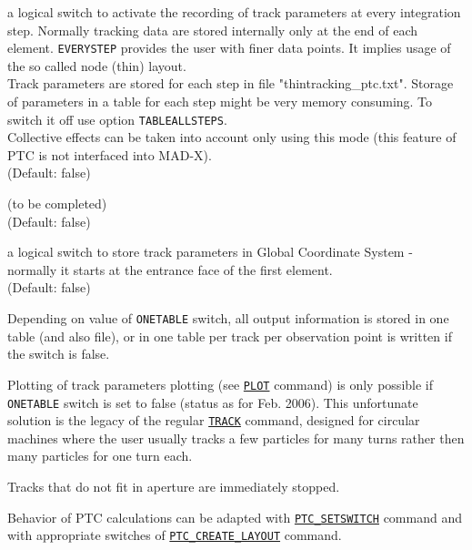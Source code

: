 \begin{madlist}
    a logical switch to activate the recording of
   track parameters at every integration step. Normally tracking data
   are stored internally only at the end of each element. {\tt EVERYSTEP}
   provides the user with finer data points. It implies usage of the so
   called node (thin) layout. \\ 
   Track parameters are stored for each step in file
   "thintracking\_ptc.txt". Storage of parameters in a table for each
   step might be very memory consuming. To switch it off use option
   {\tt TABLEALLSTEPS}.\\  
   Collective effects can be taken into account only using this mode
   (this feature of PTC is not interfaced into MAD-X). \\
   (Default: false)

    (to be completed) \\ (Default: false)
   
    a logical switch to store track parameters in Global
   Coordinate System - normally it starts at the entrance face of the
   first element. \\ (Default: false)
\end{madlist}


 Depending on value of {\tt ONETABLE} switch, all output information
is stored in one table (and also file), or in one table per track per
observation point is written if the switch is false. 


Plotting of track parameters plotting (see \hyperref[sec:plot]{\tt PLOT}
command) is only possible if {\tt ONETABLE} switch is set to false (status 
as for Feb. 2006). This unfortunate solution is the legacy of the
regular \madx \hyperref[chap:thintrack]{\tt TRACK} command, 
designed for circular machines where the user usually tracks a few
particles for many turns rather then many particles for one turn each.

Tracks that do not fit in aperture are immediately stopped. 

Behavior of PTC calculations can be adapted with
\hyperref[sec:ptc_setswitch]{\tt PTC\_SETSWITCH} command 
and with appropriate switches of
\hyperref[sec:ptc_create_layout]{\tt PTC\_CREATE\_LAYOUT} command.  




